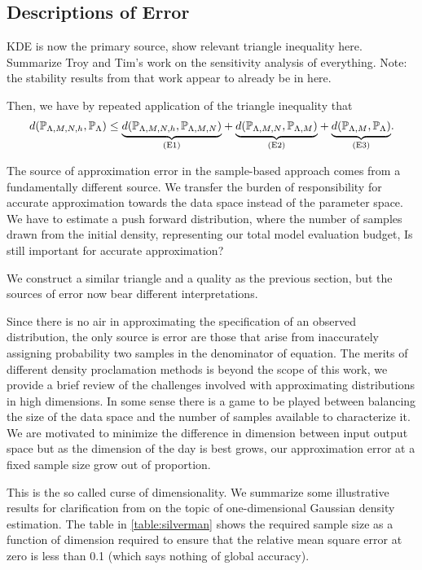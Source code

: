 \subsection{Descriptions of Error}\label{sec:sample-error}

KDE is now the primary source, show relevant triangle inequality here.
Summarize Troy and Tim's work on the sensitivity analysis of everything.
Note: the stability results from that work appear to already be in here.

Then, we have by repeated application of the triangle inequality that
\begin{equation}
\label{eq:sample-triangleineq}
d(\mathbb{P}_{{\Lambda}, M, N, h}, \mathbb{P}_{\Lambda}) \leq
\underset{ \text{(E1)} }{\underbrace{d(\mathbb{P}_{{\Lambda}, M, N, h},\mathbb{P}_{{\Lambda}, M, N})}} +
\underset{ \text{(E2)} }{\underbrace{d(\mathbb{P}_{{\Lambda}, M, N}, \mathbb{P}_{{\Lambda}, M}) }}+
\underset{ \text{(E3)} }{\underbrace{d(\mathbb{P}_{{\Lambda}, M}, \mathbb{P}_{\Lambda}) }}.
\end{equation}

The source of approximation error in the sample-based approach comes from a fundamentally different source.
We transfer the burden of responsibility for accurate approximation towards the data space instead of the parameter space.
We have to estimate a push forward distribution, where the number of samples drawn from the initial density, representing our total model evaluation budget,
Is still important for accurate approximation?

We construct a similar triangle and a quality as the previous section, but the sources of error now bear different interpretations.

Since there is no air in approximating the specification of an observed distribution, the only source is error are those that arise from inaccurately assigning probability two samples in the denominator of equation.
The merits of different density proclamation methods is beyond the scope of this work, we provide a brief review of the challenges involved with approximating distributions in high dimensions.
In some sense there is a game to be played between balancing the size of the data space and the number of samples available to characterize it.
We are motivated to minimize the difference in dimension between input output space but as the dimension of the day is best grows, our approximation error at a fixed sample size grow out of proportion.

This is the so called curse of dimensionality.
We summarize some illustrative results for clarification from \cite{Silverman} on the topic of one-dimensional Gaussian density estimation.
The table in \ref{table:silverman} shows the required sample size as a function of dimension required to ensure that the relative mean square error at zero is less than 0.1 (which says nothing of global accuracy).

